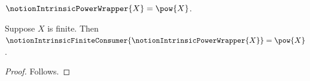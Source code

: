 

\begin{definition}\label{notion_intrinsic_power_wrapper}
    $\notionIntrinsicPowerWrapper{X}=\pow{X}$.
\end{definition}

\begin{proposition}\label{notion_intrinsic_wrapper_result_missing}
    Suppose $X$ is finite.
    Then $\notionIntrinsicFiniteConsumer
        {\notionIntrinsicPowerWrapper{X}}=\pow{X}$.
\end{proposition}
\begin{proof}
    Follows.
\end{proof}
